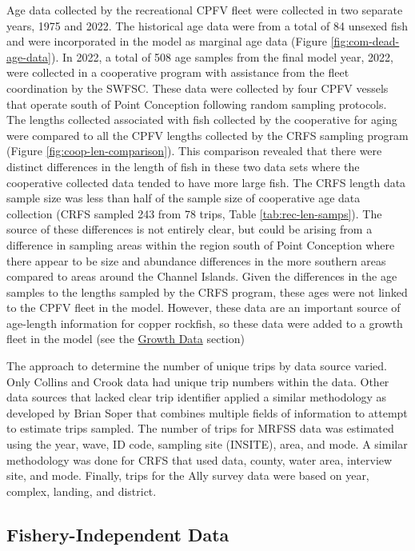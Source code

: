 \documentclass[11pt,
  english,
  letterpaper,
]{article}
\begin{document}
Age data collected by the recreational CPFV fleet were collected in two separate years, 1975 and 2022. The historical age data were from a total of 84 unsexed fish and were incorporated in the model as marginal age data (Figure \ref{fig:com-dead-age-data}). In 2022, a total of 508 age samples from the final model year, 2022, were collected in a cooperative program with assistance from the fleet coordination by the SWFSC. These data were collected by four CPFV vessels that operate south of Point Conception following random sampling protocols. The lengths collected associated with fish collected by the cooperative for aging were compared to all the CPFV lengths collected by the CRFS sampling program (Figure \ref{fig:coop-len-comparison}). This comparison revealed that there were distinct differences in the length of fish in these two data sets where the cooperative collected data tended to have more large fish. The CRFS length data sample size was less than half of the sample size of cooperative age data collection (CRFS sampled 243 from 78 trips, Table \ref{tab:rec-len-samps}). The source of these differences is not entirely clear, but could be arising from a difference in sampling areas within the region south of Point Conception where there appear to be size and abundance differences in the more southern areas compared to areas around the Channel Islands. Given the differences in the age samples to the lengths sampled by the CRFS program, these ages were not linked to the CPFV fleet in the model. However, these data are an important source of age-length information for copper rockfish, so these data were added to a growth fleet in the model (see the \protect\hyperlink{growth-data}{Growth Data} section)

The approach to determine the number of unique trips by data source varied. Only Collins and Crook data had unique trip numbers within the data. Other data sources that lacked clear trip identifier applied a similar methodology as developed by Brian Soper that combines multiple fields of information to attempt to estimate trips sampled. The number of trips for MRFSS data was estimated using the year, wave, ID code, sampling site (INSITE), area, and mode. A similar methodology was done for CRFS that used data, county, water area, interview site, and mode. Finally, trips for the Ally survey data were based on year, complex, landing, and district.

\hypertarget{fishery-independent-data}{%
\subsection{Fishery-Independent Data}\label{fishery-independent-data}}
\end{document}
